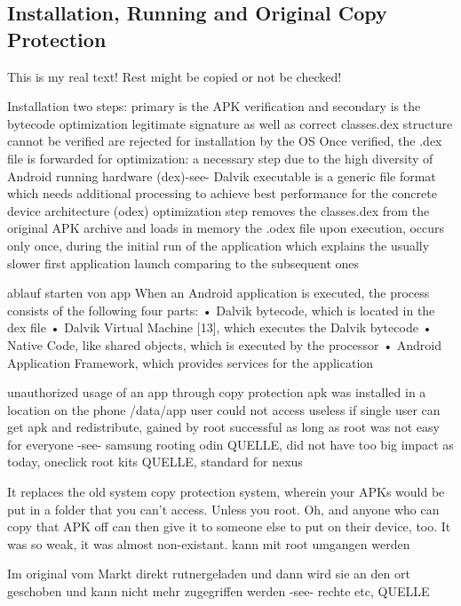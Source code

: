 \subsection{Installation, Running and Original Copy Protection} \label{subsection:android-copy}
This is my real text! Rest might be copied or not be checked!

%
Installation two steps:  primary is the APK verification and secondary is the bytecode optimization\newline
legitimate signature as well as correct classes.dex structure cannot be verified are rejected for installation by the OS\newline
Once verified, the .dex file is forwarded for optimization: a necessary step due to the high diversity of Android running hardware (dex)-see- Dalvik executable is a generic file format which needs additional processing to achieve best performance for the concrete device architecture (odex)\newline
optimization\newline
step removes the classes.dex from the original APK archive and loads in memory the .odex file upon execution, occurs only once, during the initial run of the application which explains the usually slower first application launch comparing to the subsequent ones

ablauf starten von app\newline
When an Android application is executed, the process consists of the following four parts:
• Dalvik bytecode, which is located in the dex file
• Dalvik Virtual Machine [13], which executes the Dalvik bytecode
• Native Code, like shared objects, which is executed by the processor
• Android Application Framework, which provides services for the application\newline
\cite{kovachevaMaster}
%


%
unauthorized usage of an app through copy protection
apk was installed in a location on the phone /data/app user could not access
useless if single user can get apk and redistribute, gained by root
successful as long as root was not easy for everyone -see- samsung rooting odin QUELLE, did not have too big impact as today, oneclick root kits QUELLE, standard for nexus
\cite{munteanLicense}
%


It replaces the old system copy protection system, wherein your APKs would be put in a folder that you can't access. Unless you root. Oh, and anyone who can copy that APK off can then give it to someone else to put on their device, too. It was so weak, it was almost non-existant.\newline
kann mit root umgangen werden


Im original vom Markt direkt rutnergeladen und dann wird sie an den ort geschoben und kann nicht mehr zugegriffen werden -see- rechte etc, QUELLE\newline
